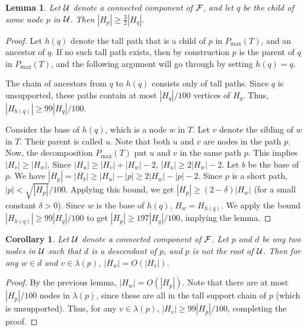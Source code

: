 \documentclass[11pt]{article}
\newtheorem{lemma}[theorem]{Lemma}
\newtheorem{corollary}[theorem]{Corollary}
\theoremstyle{definition}
\newcommand{\cF}{{\cal F}}
\newcommand{\cU}{{\cal U}}
\newcommand{\pmax}{P_{\max}}
\newcommand{\redH}{\widetilde{H}}
\begin{document}
\begin{lemma}
\label{lem:geometric}
 Let $\cU$ denote a connected component of $\cF$, and let $q$ be the child of some node $p$ in $\cU$. 
 Then $|H_p|\geq \frac{3}{2}|H_q|$. 
\end{lemma}
\begin{proof} Let $h(q)$ denote the tall path that is a child of $p$ in $\pmax(T)$,
and an ancestor of $q$. If no such tall path exists, then by construction $p$ is the parent 
of $q$ in $\pmax(T)$, and the following argument will go through by setting $h(q)=q$.

The chain of ancestors from $q$ to $h(q)$ consists only of tall paths.
Since $q$ is unsupported, these paths contain at most $|H_q|/100$ vertices of $H_q$. 
Thus, $|H_{h(q)}| \geq 99|H_q|/100$.

Consider the base
of $h(q)$, which is a node $w$ in $T$. Let $v$ denote the sibling of $w$ in $T$.
Their parent is called $u$. Note that both $u$ and $v$ are nodes in the path $p$.
Now, the decomposition $\pmax(T)$ put $u$ and $v$ in the same path $p$. This
implies $|H_v| \geq |H_w|$. Since $|H_u| \geq |H_v| + |H_w| - 2$,
$|H_u| \geq 2|H_w| - 2$. Let $b$ be the base of $p$.
We have $|H_p| = |H_b| \geq |H_u| - |p| \geq 2|H_w| - |p| - 2$. Since $p$ is a short path, $|p| < \sqrt{|H_p|}/100$.
Applying this bound, we get $|H_p| \geq (2-\delta)|H_w|$ (for a small constant $\delta > 0$).
Since $w$ is the base of $h(q)$, $H_w = H_{h(q)}$. We apply the bound $|H_{h(q)}| \geq 99|H_q|/100$
to get $|H_p| \geq 197|H_q|/100$, implying the lemma.  
\end{proof}

\begin{corollary}\label{cor:geometric}
 Let $\cU$ denote a connected component of $\cF$. Let $p$ and $d$ be any two nodes in $\cU$ such that $d$ is a descendant of $p$, and $p$ 
 is not the root of $\cU$.  Then for any $w \in d$ and $v \in \lambda(p)$, $|H_w| = O(|H_v|)$.
\end{corollary}

\begin{proof} By the previous lemma, $|H_w| = O(|H_p|)$. Note that there are at most
$|H_p|/100$ nodes in $\lambda(p)$, since these are all in the tall support chain of $p$
(which is unsupported). Thus, for any $v \in \lambda(p)$, $|H_v| \geq 99|H_p|/100$,
completing the proof.
\end{proof}
\end{document}

